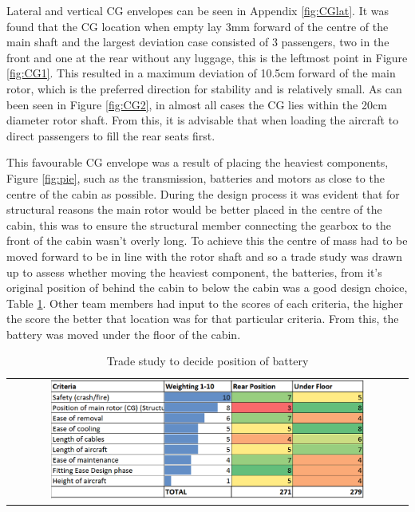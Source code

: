 \documentclass[11pt,a4paper]{article}
\begin{document}
Lateral and vertical CG envelopes can be seen in Appendix \ref{fig:CGlat}.
It was found that the CG location when empty lay 3mm forward of the centre of the main shaft and the largest deviation case consisted of 3 passengers, two in the front and one at the rear without any luggage, this is the leftmost point in Figure \ref{fig:CG1}. This resulted in a maximum deviation of 10.5cm forward of the main rotor, which is the preferred direction for stability and is relatively small\cite{prouty}. As can been seen in Figure \ref{fig:CG2}, in almost all cases the CG lies within the 20cm diameter rotor shaft. From this, it is advisable that when loading the aircraft to direct passengers to fill the rear seats first.

This favourable CG envelope was a result of placing the heaviest components, Figure \ref{fig:pie}, such as the transmission, batteries and motors as close to the centre of the cabin as possible. During the design process it was evident that for structural reasons the main rotor would be better placed in the centre of the cabin, this was to ensure the structural member connecting the gearbox to the front of the cabin wasn't overly long. To achieve this the centre of mass had to be moved forward to be in line with the rotor shaft and so a trade study was drawn up to assess whether moving the heaviest component, the batteries, from it's original position of behind the cabin to below the cabin was a good design choice, Table \ref{fig:batterypos}. Other team members had input to the scores of each criteria, the higher the score the better that location was for that particular criteria. From this, the battery was moved under the floor of the cabin. 

\begin{table}[H]
    \centering
    \caption{Trade study to decide position of battery}
    \begin{tabular}{c}
	\includegraphics[width=0.8\textwidth]{batterypos.PNG}
    \end{tabular}
    \label{fig:batterypos}
\end{table}{}
\end{document}
